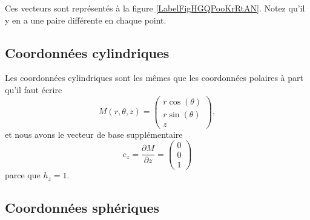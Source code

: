 Ces vecteurs sont représentés à la figure \ref{LabelFigHGQPooKrRtAN}. Notez qu'il y en a une paire différente en chaque point.
\newcommand{\CaptionFigHGQPooKrRtAN}{En brun, les lignes que le point suivrait si on ne variait qu'une coordonnées polaires à la fois. Les vecteurs rouges sont les vecteurs $e_{r}$ et $e_{\theta}$.}


\subsection{Coordonnées cylindriques}

Les coordonnées cylindriques sont les mêmes que les coordonnées polaires à part qu'il faut écrire
\begin{equation}
    M(r,\theta,z)=\begin{pmatrix}
        r\cos(\theta)    \\ 
        r\sin(\theta)    \\ 
        z    
    \end{pmatrix},
\end{equation}
et nous avons le vecteur de base supplémentaire
\begin{equation}
    e_z=\frac{ \partial M }{ \partial z }=\begin{pmatrix}
        0    \\ 
        0    \\ 
        1    
    \end{pmatrix}
\end{equation}
parce que $h_z=1$.

\subsection{Coordonnées sphériques}

